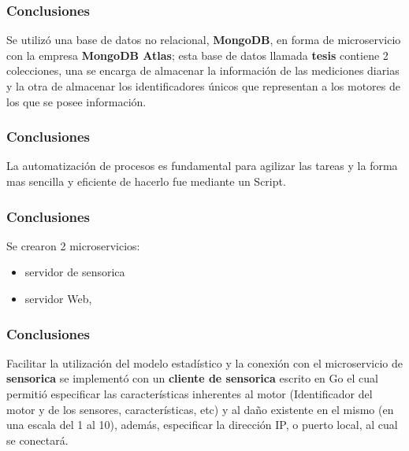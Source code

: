 \documentclass{beamer}
\begin{document}
\begin{frame}
    \frametitle{Conclusiones}
        Se utilizó una base de datos no relacional, \textbf{MongoDB}, en forma
        de microservicio con la empresa \textbf{MongoDB Atlas};
        esta base de datos llamada \textbf{tesis}
        contiene 2 colecciones, una se encarga de almacenar la información de las
        mediciones diarias y la otra de almacenar los identificadores únicos que
        representan a los motores de los que se posee información.
\end{frame}


\begin{frame}
    \frametitle{Conclusiones}
        La automatización de procesos es fundamental para agilizar las tareas y
        la forma mas sencilla y eficiente de hacerlo fue mediante un Script.
\end{frame}

\begin{frame}
    \frametitle{Conclusiones}
    \large
        Se crearon 2 microservicios:
        \begin{itemize}
            \item{servidor de sensorica}
            \item{servidor Web},
        \end{itemize}
\end{frame}

\begin{frame}
    \frametitle{Conclusiones}
    \large
        Facilitar la utilización del modelo estadístico y la conexión con
        el microservicio de \textbf{sensorica} se implementó con un \textbf{cliente de
        sensorica} escrito en Go el cual permitió especificar las características
        inherentes al motor (Identificador del motor y de los sensores, características, etc)
        y al daño existente en el mismo (en una escala del 1 al 10), además,
        especificar la dirección IP, o puerto local, al cual se conectará.
\end{frame}
\end{document}
